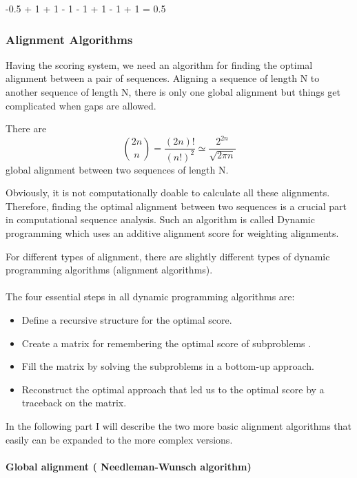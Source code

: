 \documentclass[11pt,a4paper]{report}
\begin{document}
-0.5 + 1 + 1 - 1 - 1 + 1 - 1 + 1 = 0.5




\subsubsection{Alignment Algorithms} \label{Alignment Algorithms}
Having the scoring system, we need an algorithm for finding the 
optimal alignment between a pair of sequences. 
Aligning a sequence of length N to another sequence of length N,
there is only one global alignment but things get complicated when 
gaps are allowed.
 
There are \cite{durbin}
$$ \binom{2n}{n} = \frac{(2n)!}{(n!)^2} \simeq \frac{2^{2n}}
{\sqrt{2\pi n}} $$
global alignment between two sequences of length N.

Obviously, it is not computationally doable to calculate all these
alignments. Therefore, finding the optimal alignment between two 
sequences is a crucial part in computational sequence analysis.
Such an algorithm is called Dynamic programming which uses an 
additive alignment score for  weighting alignments. 

For different types of alignment, there are slightly different 
types of dynamic programming algorithms (alignment algorithms).\\\\


The four essential steps in all dynamic programming algorithms are:

\begin{itemize} 
	\item Define a recursive structure for the optimal score\cite{eddydynamic}.
	\item  Create a  matrix for remembering the optimal score of subproblems \cite{eddydynamic}.	
	\item Fill the matrix by solving the  subproblems in a bottom-up approach\cite{eddydynamic}.
	\item Reconstruct the optimal approach that led us to the optimal score by a traceback on the matrix\cite{eddydynamic}.
\end{itemize}

In the following part I will describe the two more basic alignment 
algorithms that easily can be expanded to the more complex versions.

\paragraph{ Global alignment ( Needleman-Wunsch algorithm) }
\end{document}
